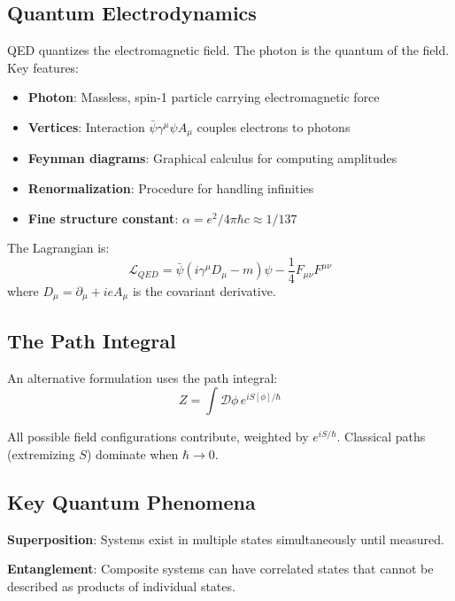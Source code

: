 \documentclass[12pt]{article}
\begin{document}
\subsection{Quantum Electrodynamics}

QED quantizes the electromagnetic field. The photon is the quantum of the field. Key features:

\begin{itemize}
    \item \textbf{Photon}: Massless, spin-1 particle carrying electromagnetic force
    \item \textbf{Vertices}: Interaction $\bar{\psi}\gamma^\mu \psi A_\mu$ couples electrons to photons
    \item \textbf{Feynman diagrams}: Graphical calculus for computing amplitudes
    \item \textbf{Renormalization}: Procedure for handling infinities
    \item \textbf{Fine structure constant}: $\alpha = e^2 / 4\pi\hbar c \approx 1/137$
\end{itemize}

The Lagrangian is:
\begin{equation}
    \mathcal{L}_{QED} = \bar{\psi}(i\gamma^\mu D_\mu - m)\psi - \frac{1}{4} F_{\mu\nu} F^{\mu\nu}
\end{equation}
where $D_\mu = \partial_\mu + ieA_\mu$ is the covariant derivative.

\subsection{The Path Integral}

An alternative formulation uses the path integral:
\begin{equation}
    Z = \int \mathcal{D}\phi \, e^{iS[\phi]/\hbar}
\end{equation}

All possible field configurations contribute, weighted by $e^{iS/\hbar}$. Classical paths (extremizing $S$) dominate when $\hbar \to 0$.

\subsection{Key Quantum Phenomena}

\textbf{Superposition}: Systems exist in multiple states simultaneously until measured.

\textbf{Entanglement}: Composite systems can have correlated states that cannot be described as products of individual states.
\end{document}
